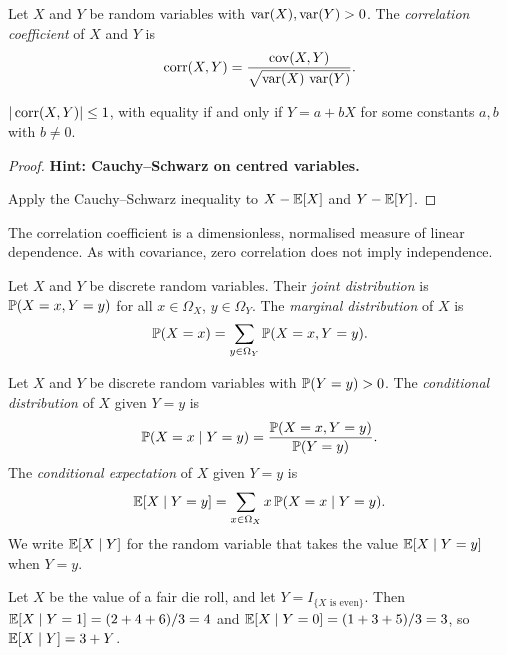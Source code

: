 \documentclass[a4paper]{article}
\begin{document}
\begin{defi}
  Let $X$ and $Y$ be random variables with $\var(X), \var(Y) > 0$. The \emph{correlation coefficient} of $X$ and $Y$ is
  \[
    \corr(X, Y) = \frac{\cov (X, Y)}{\sqrt{\var (X)\,\var (Y)}}.
  \]
\end{defi}

\begin{prop}
  $|\corr(X, Y)| \leq 1$, with equality if and only if $Y = a + bX$ for some constants $a, b$ with $b \neq 0$.
\end{prop}

\begin{proof}
  \textbf{Hint: Cauchy--Schwarz on centred variables.}

  Apply the Cauchy--Schwarz inequality to $X - \E[X]$ and $Y - \E[Y]$.
\end{proof}

\begin{remark}
  The correlation coefficient is a dimensionless, normalised measure of linear dependence. As with covariance, zero correlation does not imply independence.
\end{remark}

\begin{defi}
  Let $X$ and $Y$ be discrete random variables. Their \emph{joint distribution} is $\P(X = x, Y = y)$ for all $x \in \Omega_X$, $y \in \Omega_Y$. The \emph{marginal distribution} of $X$ is
  \[
    \P(X = x) = \sum_{y\in \Omega_Y}\P(X = x, Y = y).
  \]
\end{defi}

\begin{defi}
  Let $X$ and $Y$ be discrete random variables with $\P(Y = y) > 0$. The \emph{conditional distribution} of $X$ given $Y = y$ is
  \[
    \P(X = x\mid Y = y) = \frac{\P(X = x, Y = y)}{\P(Y = y)}.
  \]
  The \emph{conditional expectation} of $X$ given $Y = y$ is
  \[
    \E[X\mid Y = y] = \sum_{x\in \Omega_X}x\,\P(X = x\mid Y = y).
  \]
  We write $\E[X\mid Y]$ for the random variable that takes the value $\E[X \mid Y = y]$ when $Y = y$.
\end{defi}

\begin{eg}
  Let $X$ be the value of a fair die roll, and let $Y = I_{\{X \text{ is even}\}}$. Then $\E[X\mid Y = 1] = (2 + 4 + 6)/3 = 4$ and $\E[X\mid Y = 0] = (1 + 3 + 5)/3 = 3$, so $\E[X\mid Y] = 3 + Y$.
\end{eg}
\end{document}
